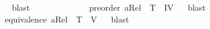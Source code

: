 \begin{isabellebody}
\ %
%
\isamarkupfalse%
\ blast%
%
%
\ \ \ \ \ \ \ \ \ \isanewline
\ \ \isamarkupfalse%
\ {\isachardoublequoteopen}preorder\ aRel\ {\isasymLongrightarrow}\ {\isasymlfloor}T{\isasymrfloor}\ {\isasymand}\ {\isasymlfloor}IV{\isasymrfloor}{\isachardoublequoteclose}%
\ %
%
\isamarkupfalse%
\ blast\ %
%
%
%
\isanewline
\ \ \isamarkupfalse%
\ {\isachardoublequoteopen}equivalence\ aRel\ {\isasymLongrightarrow}\ {\isasymlfloor}T{\isasymrfloor}\ {\isasymand}\ {\isasymlfloor}V{\isasymrfloor}{\isachardoublequoteclose}%
\ %
%
\isamarkupfalse%
\ blast\ %
%
%
%
%
%
%
%
%
%
%
%
%
%
%
%
%
%
%
%
%
%
%
%
%
%
%
%
%
%
%
%
%
%
%
%
%
%
%
%
%
%
%
%
%
%
%
%
%
%
%
%
%
%
%
%
%
%
%
%
%
%
%
%
%
%
%
%
%
%
%
%
%
%
%
%
%
%
%
%
%
%
%
\end{isabellebody}%
